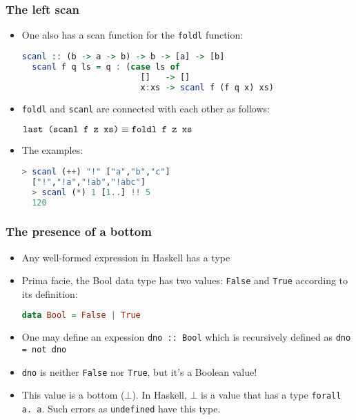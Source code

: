 \documentclass[10pt,pdf,utf8,russian,aspectratio=169]{beamer}
\begin{document}
\begin{frame}[fragile]
  \frametitle{The left scan}
  \begin{itemize}
  \item One also has a scan function for the \verb"foldl" function:
  \begin{lstlisting}[language=Haskell]
  scanl :: (b -> a -> b) -> b -> [a] -> [b]
  scanl f q ls = q : (case ls of
                        []   -> []
                        x:xs -> scanl f (f q x) xs)
  \end{lstlisting}
  \item \verb"foldl" and \verb"scanl" are connected with each other as follows:
  \begin{center}
   $\verb"last (scanl f z xs)" \equiv \verb"foldl f z xs"$
  \end{center}
  \item The examples:
  \begin{lstlisting}[language=Haskell]
  > scanl (++) "!" ["a","b","c"]
  ["!","!a","!ab","!abc"]
  > scanl (*) 1 [1..] !! 5
  120
  \end{lstlisting}
  \end{itemize}
\end{frame}

\begin{frame}[fragile]
  \frametitle{The presence of a bottom}

  \begin{itemize}
    \item Any well-formed expression in Haskell has a type
    \item Prima facie, the Bool data type has two values: \verb"False" and \verb"True" according to its definition:
    \begin{lstlisting}[language=Haskell]
    data Bool = False | True
    \end{lstlisting}
    \item One may define an expession \verb"dno :: Bool" which is recursively defined as \verb"dno = not dno"
    \item \verb"dno" is neither \verb"False" nor \verb"True", but it's a Boolean value!
    \item This value is a bottom ($\bot$). In Haskell, $\bot$ is a value that has a type \verb"forall a. a". 
    Such errors as \verb"undefined" have this type.
  \end{itemize}
\end{frame}
\end{document}
